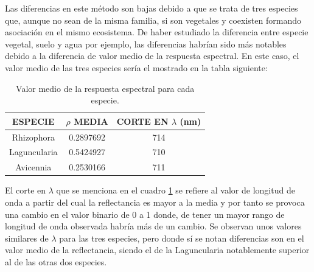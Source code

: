 Las diferencias en este método son bajas debido a que se trata de tres especies que, aunque no sean de la misma familia, si son vegetales y coexisten formando asociación en el mismo ecosistema. De haber estudiado la diferencia entre especie vegetal, suelo y agua por ejemplo, las diferencias habrían sido más notables debido a la diferencia de valor medio de la respuesta espectral. En este caso, el valor medio de las tres especies sería el mostrado en la tabla siguiente:

\begin{table}[ht]
	\centering
	\caption[Valores medios de la respuesta espectral]{Valor medio de la respuesta espectral para cada especie.}
	\begin{tabular}{|c|c|c|}
	\hline
	ESPECIE & $\rho$ MEDIA & CORTE EN $\lambda$ (nm)\\
	\hline
	Rhizophora & 0.2897692 & 714	\\
	\hline
	Laguncularia & 0.5424927 & 710\\
	\hline
	Avicennia & 0.2530166 & 711\\
	\hline
	\end{tabular}
	\label{tab:mediaIAE}
\end{table}

El corte en $\lambda$ que se menciona en el cuadro \ref{tab:mediaIAE} se refiere al valor de longitud de onda a partir del cual la reflectancia es mayor a la media y por tanto se provoca una cambio en el valor binario de 0 a 1 donde, de tener un mayor rango de longitud de onda observada habría más de un cambio. Se observan unos valores similares de $\lambda$ para las tres especies, pero donde sí se notan diferencias son en el valor medio de la reflectancia, siendo el de la Laguncularia notablemente superior al de las otras dos especies.

